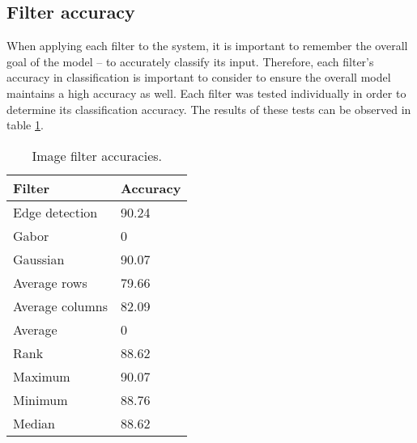 	\subsection{Filter accuracy} \label{s:filters:accuracy}
		When applying each filter to the system, it is important to remember the overall goal of the model -- to accurately classify its input. Therefore, each filter's accuracy in classification is important to consider to ensure the overall model maintains a high accuracy as well. Each filter was tested individually in order to determine its classification accuracy. The results of these tests can be observed in table \ref{t:filterAccuracies}.
		\begin{table}
			\begin{center}
				\caption{Image filter accuracies.}
				\label{t:filterAccuracies}
				\begin{tabular}{l|l}\hline
					\textbf{Filter} & \textbf{Accuracy}\\\hline
					Edge detection & 90.24\\\hline
					Gabor & 0\\\hline
					Gaussian & 90.07\\\hline
					Average rows & 79.66\\\hline
					Average columns & 82.09\\\hline
					Average & 0\\\hline
					Rank & 88.62\\\hline
					Maximum & 90.07\\\hline
					Minimum & 88.76\\\hline
					Median & 88.62\\\hline
				\end{tabular}
			\end{center}
		\end{table}
